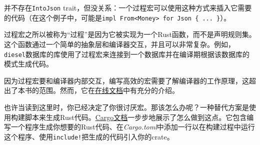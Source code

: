 并不存在\texttt{IntoJson} trait，但没关系：一个过程宏可以使用这种方式来插入它需要的代码（在这个例子中，可能是\texttt{impl From<Money> for Json \{ ... \}}）。

过程宏之所以被称为“过程”是因为它被实现为一个Rust函数，而不是声明规则集。这个函数通过一个简单的抽象层和编译器交互，并且可以非常复杂。例如，\texttt{diesel}数据库的库使用了过程宏来连接到一个数据库并在编译期根据该数据库的模式生成代码。

因为过程宏要和编译器内部交互，编写高效的宏需要了解编译器的工作原理，这超出了本书的范围。然而，它在\href{https://doc.rust-lang.org/book/ch19-06-macros.html\#procedural-macros-for-generating-code-from-attributes}{在线文档}中有充分的介绍。

也许当读到这里时，你已经决定了你很讨厌宏。那该怎么办呢？一种替代方案是使用构建脚本来生成Rust代码。\href{https://doc.crates.io/build-script.html\#case-study-code-generation}{Cargo文档}一步步地展示了怎么做到这点。它包含编写一个程序生成你想要的Rust代码、在\emph{Cargo.toml}中添加一行以在构建过程中运行这个程序、使用\texttt{include!}把生成的代码引入你的crate。
